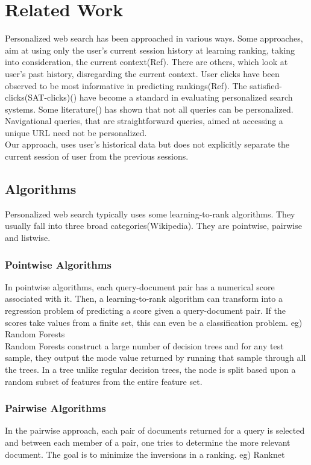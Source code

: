 \documentclass[11pt,letterpaper]{article}
\begin{document}
\section{Related Work}
Personalized web search has been approached in various ways. Some approaches, aim at using only the user's current session history at learning ranking, taking into consideration, the current context(Ref). There are others, which look at user's past history, disregarding the current context. User clicks have been observed to be most informative in predicting rankings(Ref). The satisfied-clicks(SAT-clicks)() have become a standard in evaluating personalized search systems. Some literature() has shown that not all queries can be personalized. Navigational queries, that are straightforward queries, aimed at accessing a unique URL need not be personalized. \\
Our approach, uses user's historical data but does not explicitly separate the current session of user from the previous sessions. %
\subsection{Algorithms}
Personalized web search typically uses some learning-to-rank algorithms. They usually 
fall into three broad categories(Wikipedia). They are pointwise, pairwise and listwise. 
\subsubsection{Pointwise Algorithms}
In pointwise algorithms, each query-document pair has a numerical score associated with it. Then, a learning-to-rank algorithm can transform into a regression problem of predicting a score given a query-document pair. If the scores take values from a finite set, this can even be a classification problem. eg) Random Forests\\
Random Forests construct a large number of decision trees and for any test sample, they output the mode value returned by running that sample through all the trees. In a tree unlike regular decision trees, the node is split based upon a random subset of features from the entire feature set. 
\subsubsection{Pairwise Algorithms}
In the pairwise approach, each pair of documents returned for a query is selected and between each member of a pair, one tries to determine the more relevant document. The goal is to minimize the inversions in a ranking.%
eg) Ranknet
\end{document}
